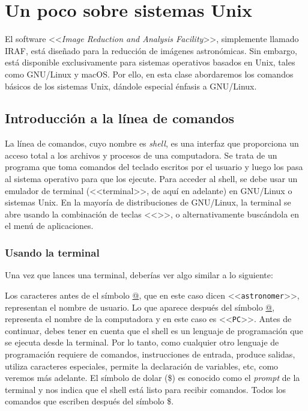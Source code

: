 \chapter{Un poco sobre sistemas Unix}
El software <<\emph{Image Reduction and Analysis Facility}>>, simplemente llamado IRAF, está diseñado para la reducción de imágenes astronómicas. Sin embargo, está disponible exclusivamente para sistemas operativos basados en Unix, tales como GNU/Linux y macOS. Por ello, en esta clase abordaremos los comandos básicos de los sistemas Unix, dándole especial énfasis a GNU/Linux.

\section{Introducción a la línea de comandos}
La línea de comandos, cuyo nombre es \emph{shell}, es una interfaz que proporciona un acceso total a los archivos y procesos de una computadora. Se trata de un programa que toma comandos del teclado escritos por el usuario y luego los pasa al sistema operativo para que los ejecute. Para acceder al shell, se debe usar un emulador de terminal (<<terminal>>, de aquí en adelante) en GNU/Linux o sistemas Unix. En la mayoría de distribuciones de GNU/Linux, la terminal se abre usando la combinación de teclas <<>>, o alternativamente buscándola en el menú de aplicaciones.

\subsection{Usando la terminal}
Una vez que lances una terminal, deberías ver algo similar a lo siguiente:

Los caracteres antes de el símbolo \url{@}, que en este caso dicen <<\texttt{astronomer}>>, representan el nombre de usuario. Lo que aparece después del símbolo \url{@}, representa el nombre de la computadora y en este caso es <<\texttt{PC}>>. Antes de continuar, debes tener en cuenta que el shell es un lenguaje de programación que se ejecuta desde la terminal. Por lo tanto, como cualquier otro lenguaje de programación requiere de comandos, instrucciones de entrada, produce salidas, utiliza caracteres especiales, permite la declaración de variables, etc, como veremos más adelante. El símbolo de dolar (\$) es conocido como el \emph{prompt} de la terminal y nos indica que el shell está listo para recibir comandos. Todos los comandos que escriben después del símbolo \$. 

